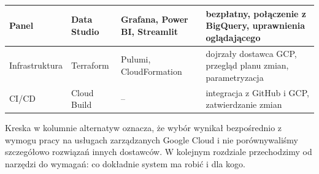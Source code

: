 \begin{table}[hbp]
\begin{tabular}{|p{}|p{}|p{}|p{}|}
    \hline
    Panel                    & Data Studio                             & Grafana, Power BI, Streamlit & bezpłatny, połączenie z BigQuery, uprawnienia oglądającego                           \\
    \hline
    Infrastruktura           & Terraform                               & Pulumi, CloudFormation       & dojrzały dostawca GCP, przegląd planu zmian, parametryzacja                          \\
    \hline
    CI/CD                    & Cloud Build                             & --                           & integracja z GitHub i GCP, zatwierdzanie zmian                                       \\
    \hline
  \end{tabular}
\end{table}

Kreska w kolumnie alternatyw oznacza, że wybór wynikał bezpośrednio z wymogu pracy na usługach zarządzanych Google Cloud i nie porównywaliśmy szczegółowo rozwiązań innych dostawców.
W kolejnym rozdziale przechodzimy od narzędzi do wymagań: co dokładnie system ma robić i dla kogo.
